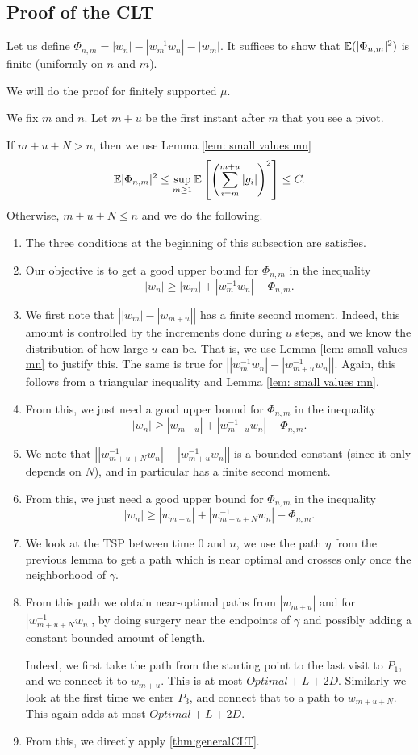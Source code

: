 \subsection{Proof of the CLT}

Let us define $\Phi_{n,m}=|w_n|-|w_m^{-1}w_n|-|w_m|$. It suffices to show that $\mathbb{E}(|\Phi_{n,m}|^2)$ is finite (uniformly on $n$ and $m$).

We will do the proof for finitely supported $\mu$.

We fix $m$ and $n$. Let $m+u$ be the first instant after $m$ that you see a pivot.

If $m+u+N>n$, then we use Lemma \ref{lem: small values mn} 
$$
\mathbb{E} |\Phi_{n,m}|^2\le \sup_{m\ge 1}\mathbb{E}\left[\left( \sum_{i=m}^{m+u}|g_i| \right)^2\right]\le C.
$$
Otherwise, $m+u+N\le n$ and we do the following.


\begin{enumerate}
	\item The three conditions at the beginning of this subsection are satisfies.
	\item Our objective is to get a good upper bound for $\Phi_{n,m}$ in the inequality
	\[|w_n|\ge |w_m|+|w_{m}^{-1}w_n|-\Phi_{n,m}. \]
	\item We first note that $\left| |w_m|-|w_{m+u}| \right|$ has a finite second moment. Indeed, this amount is controlled by the increments done during $u$ steps, and we know the distribution of how large $u$ can be. That is, we use Lemma \ref{lem: small values mn} to justify this.  The same is true for $\left| |w_m^{-1}w_n|-|w_{m+u}^{-1}w_n| \right|$. Again, this follows from a triangular inequality and Lemma \ref{lem: small values mn}.
	\item From this, we just need a good upper bound for $\Phi_{n,m}$ in the inequality
	\[|w_n|\ge |w_{m+u}|+|w_{m+u}^{-1}w_n|-\Phi_{n,m}. \]
	\item We note that $\left||w_{m+u+N}^{-1}w_n| -|w_{m+u}^{-1}w_n|\right|$ is a bounded constant (since it only depends on $N$), and in particular has a finite second moment.
	\item From this, we just need a good upper bound for $\Phi_{n,m}$ in the inequality
	\[|w_n|\ge |w_{m+u}|+|w_{m+u+N}^{-1}w_n|-\Phi_{n,m}. \]
	\item We look at the TSP between time $0$ and $n$, we use the path $\eta$ from the previous lemma to get a path which is near optimal and crosses only once the neighborhood of $\gamma$.
	\item From this path we obtain near-optimal paths from $|w_{m+u}|$ and for $|w_{m+u+N}^{-1}w_n|$, by doing surgery near the endpoints of $\gamma$ and possibly adding a constant bounded amount of length.
	
	Indeed, we first take the path from the starting point to the last visit to $P_1$, and we connect it to $w_{m+u}$. This is at most $Optimal+L+2D$. Similarly we look at the first time we enter $P_3$, and connect that to a path to $w_{m+u+N}$. This again adds at most $Optimal+L+2D$.
	\item From this, we directly apply \ref{thm:generalCLT}.
\end{enumerate}
